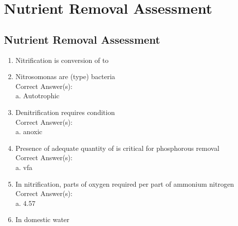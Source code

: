 
\chapter{Nutrient Removal Assessment}

\section*{Nutrient Removal Assessment}
\begin{enumerate}
\item Nitrification is conversion of {\underline{\hspace{1cm}}} to {\underline{\hspace{1cm}}}

\item Nitrosomonas are {\underline{\hspace{1cm}}} (type) bacteria \\

Correct Answer(s):\\
a. Autotrophic\\

\item Denitrification requires {\underline{\hspace{1cm}}} condition \\

Correct Answer(s):\\
a. anoxic

\item Presence of adequate quantity of {\underline{\hspace{1cm}}} is critical for phosphorous removal \\

Correct Answer(s):\\
a. vfa

\item In nitrification, {\underline{\hspace{1cm}}} parts of oxygen required per part of ammonium nitrogen \\

Correct Answer(s):\\
a. 4.57 

\item In domestic water {\underline{\hspace{1cm}}} %


\end{enumerate}
